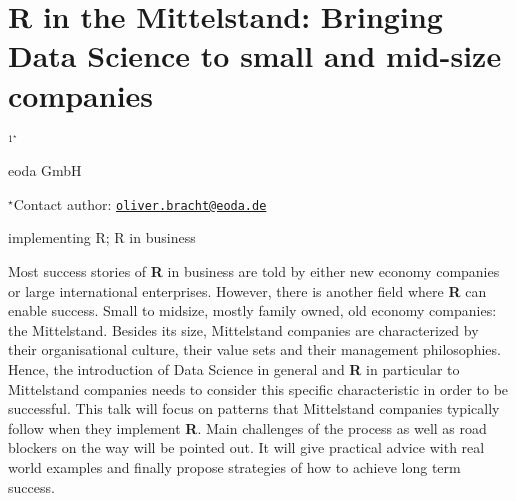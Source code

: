 \documentclass[\main/boa.tex]{subfiles}
\begin{document}
\section{R in the Mittelstand: Bringing Data Science to small and mid-size
companies}

\begin{center}
  {\bf {}$^{1^\star}$}
\end{center}

\vskip 0.3cm

\begin{affiliations}
\begin{enumerate}
\begin{minipage}{0.915\textwidth}
\centering
\item eoda GmbH \\[-2pt]
\end{minipage}
\end{enumerate}
$^\star$Contact author: \href{mailto:oliver.bracht@eoda.de}{\nolinkurl{oliver.bracht@eoda.de}}\\
\end{affiliations}

\vskip 0.5cm

\begin{minipage}{0.915\textwidth}
\keywords implementing R; R in business
\end{minipage}

\vskip 0.8cm

Most success stories of \textbf{R} in business are told by either new
economy companies or large international enterprises. However, there is
another field where \textbf{R} can enable success. Small to midsize,
mostly family owned, old economy companies: the Mittelstand. Besides its
size, Mittelstand companies are characterized by their organisational
culture, their value sets and their management philosophies. Hence, the
introduction of Data Science in general and \textbf{R} in particular to
Mittelstand companies needs to consider this specific characteristic in
order to be successful. This talk will focus on patterns that
Mittelstand companies typically follow when they implement \textbf{R}.
Main challenges of the process as well as road blockers on the way will
be pointed out. It will give practical advice with real world examples
and finally propose strategies of how to achieve long term success.
\end{document}

